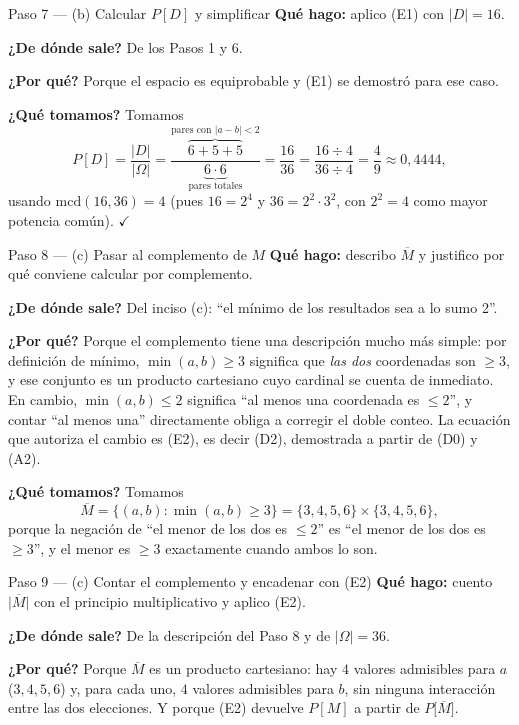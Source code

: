 \documentclass[11pt]{article}
\begin{document}
\begin{sol}
\begin{paso}{Paso 7 --- (b) Calcular $P[D]$ y simplificar}
\textbf{Qué hago:} aplico (E1) con $|D|=16$.

\textbf{¿De dónde sale?} De los Pasos 1 y 6.

\textbf{¿Por qué?} Porque el espacio es equiprobable y (E1) se demostró para ese caso.

\textbf{¿Qué tomamos?} Tomamos
\[
P[D]=\frac{|D|}{|\Omega|}
=\frac{\overbrace{6+5+5}^{\text{pares con }|a-b|<2}}{\underbrace{6\cdot 6}_{\text{pares totales}}}
=\frac{16}{36}
=\frac{16\div 4}{36\div 4}=\frac{4}{9}\approx 0{,}4444 ,
\]
usando $\mathrm{mcd}(16,36)=4$ (pues $16=2^{4}$ y $36=2^{2}\cdot 3^{2}$, con $2^{2}=4$ como
mayor potencia común). $\checkmark$
\end{paso}

\begin{paso}{Paso 8 --- (c) Pasar al complemento de $M$}
\textbf{Qué hago:} describo $\overline{M}$ y justifico por qué conviene calcular por
complemento.

\textbf{¿De dónde sale?} Del inciso (c): ``el mínimo de los resultados sea a lo sumo 2''.

\textbf{¿Por qué?} Porque el complemento tiene una descripción mucho más simple: por definición
de mínimo, $\min(a,b)\ge 3$ significa que \emph{las dos} coordenadas son $\ge 3$, y ese conjunto
es un producto cartesiano cuyo cardinal se cuenta de inmediato. En cambio, $\min(a,b)\le 2$
significa ``al menos una coordenada es $\le 2$'', y contar ``al menos una'' directamente obliga
a corregir el doble conteo. La ecuación que autoriza el cambio es (E2), es decir (D2),
demostrada a partir de (D0) y (A2).

\textbf{¿Qué tomamos?} Tomamos
\[
\overline{M}=\{(a,b): \min(a,b)\ge 3\}=\{3,4,5,6\}\times\{3,4,5,6\} ,
\]
porque la negación de ``el menor de los dos es $\le 2$'' es ``el menor de los dos es $\ge 3$'',
y el menor es $\ge 3$ exactamente cuando ambos lo son.
\end{paso}

\begin{paso}{Paso 9 --- (c) Contar el complemento y encadenar con (E2)}
\textbf{Qué hago:} cuento $\big|\overline{M}\big|$ con el principio multiplicativo y aplico
(E2).

\textbf{¿De dónde sale?} De la descripción del Paso 8 y de $|\Omega|=36$.

\textbf{¿Por qué?} Porque $\overline{M}$ es un producto cartesiano: hay $4$ valores admisibles
para $a$ ($3,4,5,6$) y, para cada uno, $4$ valores admisibles para $b$, sin ninguna interacción
entre las dos elecciones. Y porque (E2) devuelve $P[M]$ a partir de $P\big[\overline{M}\big]$.


\end{paso}
\end{sol}
\end{document}
